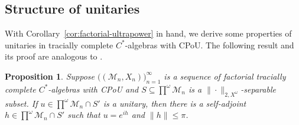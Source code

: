 \documentclass[a4paper,11pt]{amsart}
\newtheorem{proposition}[theorem]{Proposition}
\theoremstyle{definition}
\numberwithin{equation}{section}
\numberwithin{theorem}{section}
\newcommand{\M}{\mathcal{M}}
\begin{document}
\subsection{Structure of unitaries}\label{sec:app-CPoU-unitaries}

With Corollary~\ref{cor:factorial-ultrapower} in hand, we derive some properties of unitaries in tracially complete $C^*$-algebras with CPoU.  The following result and its proof are analogous to \cite[Proposition~2.1]{CETW-classification}.

\begin{proposition}\label{prop:unitary-exponentials}
	Suppose $\big((\M_n, X_n)\big)_{n=1}^\infty$ is a sequence of factorial tracially complete $C^*$-algebras with CPoU and $S \subseteq \prod^\omega \M_n$ is a $\|\cdot\|_{2, X^\omega}$-separable subset.  If $u \in \prod^\omega \M_n \cap S'$ is a unitary, then there is a self-adjoint $h \in \prod^\omega \M_n \cap S'$ such that $u = e^{ih}$ and $\|h\| \leq \pi$.
\end{proposition}
\end{document}
